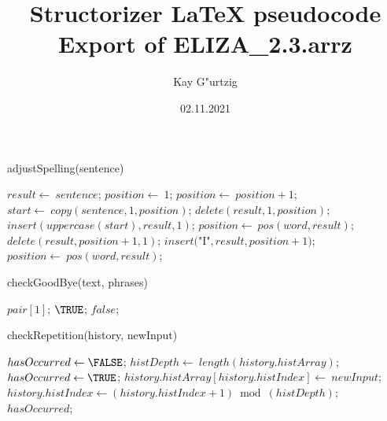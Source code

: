 \documentclass[a4paper,10pt]{article}
\title{Structorizer LaTeX pseudocode Export of ELIZA\_2.3.arrz}
\author{Kay G"urtzig}
\date{02.11.2021}
\begin{document}
\begin{algorithm}
\caption{adjustSpelling(sentence)}
\begin{algorithmic}[5]

\STATE {}
  \STATE \(result\gets\ sentence\);
  \STATE \(position\gets\ 1\);
    \STATE \(position\gets\ position+1\);
  \ENDWHILE
    \STATE \(start\gets\ copy(sentence,1,position)\);
    \STATE \(delete(result,1,position)\);
    \STATE \(insert(uppercase(start),result,1)\);
  \ENDIF
    \STATE \(position\gets\ pos(word,result)\);
      \STATE \(delete(result,position+1,1)\);
      \STATE \(insert(\)"{}I"{}\(,result,position+1)\);
      \STATE \(position\gets\ pos(word,result)\);
    \ENDWHILE
  \ENDFOR

\end{algorithmic}
\end{algorithm}


\begin{algorithm}
\caption{checkGoodBye(text, phrases)}
\begin{algorithmic}[5]

\STATE {}
\STATE {}
\STATE {}
\STATE {}
      \PRINT\(pair[1]\);
      \RETURN\(\TRUE\);
    \ENDIF
  \ENDFOR
  \RETURN\(false\);

\end{algorithmic}
\end{algorithm}


\begin{algorithm}
\caption{checkRepetition(history, newInput)}
\begin{algorithmic}[5]

\STATE {}
\STATE {}
  \STATE \(hasOccurred\gets\FALSE\);
    \STATE \(histDepth\gets\ length(history.histArray)\);
        \STATE \(hasOccurred\gets\TRUE\);
      \ENDIF
    \ENDFOR
    \STATE \(history.histArray[history.histIndex]\gets\ newInput\);
    \STATE \(history.histIndex\gets(history.histIndex+1)\bmod(histDepth)\);
  \ENDIF
  \RETURN\(hasOccurred\);

\end{algorithmic}
\end{algorithm}
\end{document}
